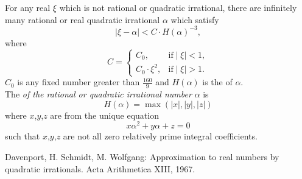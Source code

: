 \documentclass[12pt]{article}
\begin{document}
For any real $\xi$ which is not rational or quadratic irrational, there are infinitely many rational or real quadratic irrational $\alpha$ which satisfy
\begin{displaymath}
\mid \xi - \alpha \mid < C\cdot H(\alpha)^{-3},
\end{displaymath}
where
\begin{displaymath}
C = \left\{
\begin{array}{ll}
C_0, & \textrm{if} \mid\xi\mid < 1, \\
C_0\cdot \xi^2, & \textrm{if} \mid\xi\mid >1.
\end{array}\right.
\end{displaymath}
$C_0$ is any fixed number greater than $\frac{160}{9}$ and $H(\alpha )$ is the  of $\alpha$.\cite{DS}\\
The \emph{ of the rational or quadratic irrational number} $\alpha$ is 
$$H(\alpha)=\operatorname{max}(|x|,|y|,|z|)$$
where $x$,$y$,$z$ are from the unique equation
$$x\alpha^2+y\alpha+z=0$$
such that $x$,$y$,$z$ are not all zero relatively prime integral coefficients.\cite{DS}
\begin{thebibliography}{1}
 Davenport, H. Schmidt, M. Wolfgang:  Approximation to real numbers by quadratic irrationals. Acta Arithmetica XIII, 1967.
\end{thebibliography}
\end{document}
